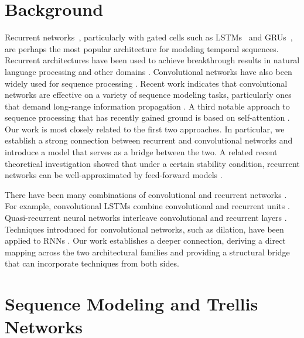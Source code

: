 \documentclass{article} \usepackage{iclr2019_conference,times}
\begin{document}
\section{Background}
\label{sec:related-works}

Recurrent networks~\citep{Elman90findstructure,Werbos1990,Graves2012}, particularly with gated cells such as LSTMs~\citep{hochreiterLSTM} and GRUs~\citep{choGRU}, are perhaps the most popular architecture for modeling temporal sequences. Recurrent architectures have been used to achieve breakthrough results in natural language processing and other domains \citep{Sutskever2011,graves2013generating,sutskeverSeqToSeq,Bahdanau2015,Vinyals2015,Karpathy2015}.
Convolutional networks have also been widely used for sequence processing \citep{waibel,Collobert2011}. Recent work indicates that convolutional networks are effective on a variety of sequence modeling tasks, particularly ones that demand long-range information propagation \citep{waveNet,kalchbrenner2016neural,dauphinGatedConv,gehring2017convolutional,bai2018empirical}.
A third notable approach to sequence processing that has recently gained ground is based on self-attention \citep{vaswani2017attention,santoro2018relational,chen2018best}. Our work is most closely related to the first two approaches. In particular, we establish a strong connection between recurrent and convolutional networks and introduce a model that serves as a bridge between the two. A related recent theoretical investigation showed that under a certain stability condition, recurrent networks can be well-approximated by feed-forward models \citep{miller2018recurrent}.

There have been many combinations of convolutional and recurrent networks \citep{sainath2015convolutional}. For example, convolutional LSTMs combine convolutional and recurrent units \citep{Donahue2015,Venugopalan2015,xingjian2015convolutional}. Quasi-recurrent neural networks interleave convolutional and recurrent layers \citep{bradbury2016quasi}. Techniques introduced for convolutional networks, such as dilation, have been applied to RNNs \citep{chang2017dilated}. Our work establishes a deeper connection, deriving a direct mapping across the two architectural families and providing a structural bridge that can incorporate techniques from both sides.


\section{Sequence Modeling and Trellis Networks}
\label{sec:trellisnet}
\end{document}
